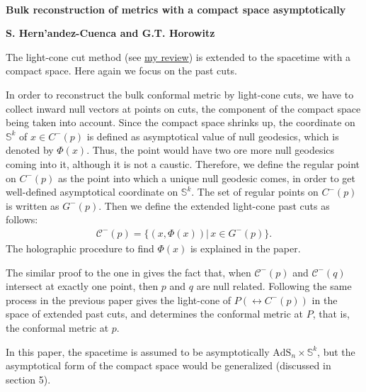 \documentclass[12pt]{article}
\date{}
\begin{document}
{\Large{}\\[2mm]
\textbf{Bulk reconstruction of metrics with a compact space asymptotically \cite{Hernandez-Cuenca:2020ppu}
}
}

\noindent
\hfill
\textbf{S. Hern'andez-Cuenca and G.T. Horowitz}%

\vspace{12pt}
The light-cone cut method \cite{Engelhardt:2016wgb} 
(see \href{https://albertmcc.github.io/web/reviews/light-cone1.pdf}{\color{blue}my review}) 
is extended to the spacetime with a compact space.
Here again we focus on the past cuts.

In order to reconstruct the bulk conformal metric by light-cone cuts, we have to collect inward null vectors at points on cuts,
the component of the compact space being taken into account.
Since the compact space shrinks up, the coordinate on $\mathbb S^k$ of $x \in C^-(p)$ 
is defined as asymptotical value of null geodesics, which is denoted by $\Phi(x)$.
Thus, the point would have two ore more null geodesics coming into it,
although it is not a caustic.
Therefore, we define the regular point on $C^-(p)$ as the point into which a unique null geodesic comes, 
in order to get well-defined asymptotical coordinate on $\mathbb S^k$.
The set of regular points on $C^-(p)$ is written as $G^-(p)$.
Then we define the extended light-cone past cuts as follows:
\begin{align}
	\mathcal C^-(p) = \{(x,\Phi(x))|\,x\in G^-(p)\}.
\end{align}
The holographic procedure to find $\Phi(x)$ is explained in the paper.

The similar proof to the one in \cite{Engelhardt:2016wgb} gives the fact that, 
when $\mathcal C^-(p)$ and $\mathcal C^-(q)$ intersect at exactly one point, then $p$ and $q$ are null related.
Following the same process in the previous paper gives the light-cone of $P (\leftrightarrow C^-(p))$ 
in the space of extended past cuts, and determines the conformal metric at $P$, that is, the conformal metric at $p$.

In this paper, the spacetime is assumed to be asymptotically $\mathrm{AdS}_n\times\mathbb S^k$,
but  the asymptotical form of the compact space would be generalized (discussed in section 5).



 

\end{document}
